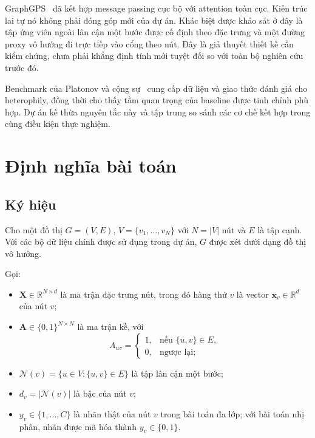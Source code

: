 \documentclass[12pt,a4paper]{article}
\numberwithin{equation}{section}
\theoremstyle{definition}
\begin{document}
GraphGPS~\cite{rampasek2022gps} đã kết hợp message passing cục bộ với attention toàn cục. Kiến trúc lai tự nó không phải đóng góp mới của dự án. Khác biệt được khảo sát ở đây là tập ứng viên ngoài lân cận một bước được cố định theo đặc trưng và một đường proxy vô hướng đi trực tiếp vào cổng theo nút. Đây là giả thuyết thiết kế cần kiểm chứng, chưa phải khẳng định tính mới tuyệt đối so với toàn bộ nghiên cứu trước đó.

Benchmark của Platonov và cộng sự~\cite{platonov2023critical} cung cấp dữ liệu và giao thức đánh giá cho heterophily, đồng thời cho thấy tầm quan trọng của baseline được tinh chỉnh phù hợp. Dự án kế thừa nguyên tắc này và tập trung so sánh các cơ chế kết hợp trong cùng điều kiện thực nghiệm.

\section{Định nghĩa bài toán}

\subsection{Ký hiệu}
Cho một đồ thị $G = (V, E)$, $V = \{v_1, \dots, v_N\}$ với $N = |V|$ nút và $E$ là tập cạnh. Với các bộ dữ liệu chính được sử dụng trong dự án, $G$ được xét dưới dạng đồ thị vô hướng.

Gọi:
\begin{itemize}
    \item $\mathbf{X} \in \mathbb{R}^{N \times d}$ là ma trận đặc trưng nút, trong đó hàng thứ $v$ là vector $\mathbf{x}_v \in \mathbb{R}^d$ của nút $v$;
    \item $\mathbf{A} \in \{0, 1\}^{N \times N}$ là ma trận kề, với
    \begin{equation}
    A_{uv} = \begin{cases}
    1, & \text{nếu } \{u, v\} \in E, \\
    0, & \text{ngược lại;}
    \end{cases}
    \end{equation}
    \item $\mathcal{N}(v) = \{u \in V : \{u, v\} \in E\}$ là tập lân cận một bước;
    \item $d_v = |\mathcal{N}(v)|$ là bậc của nút $v$;
    \item $y_v \in \{1, \dots, C\}$ là nhãn thật của nút $v$ trong bài toán đa lớp; với bài toán nhị phân, nhãn được mã hóa thành $y_v\in\{0,1\}$.
\end{itemize}
\end{document}
